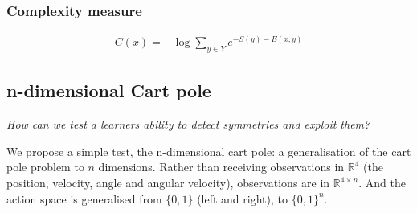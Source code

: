 \subsubsection{Complexity measure}

\begin{align*}
C(x) = -\log \sum_{y\in Y} e^{-S(y) - E(x, y)}
\end{align*}




%
%
%
%
%
%

\subsection{n-dimensional Cart pole}\label{action-space-experiments}

\begin{displayquote}
  \textit{How can we test a learners ability to detect symmetries and exploit them?}
\end{displayquote}

We propose a simple test, the n-dimensional cart pole: a generalisation of the
cart pole problem to $n$ dimensions. Rather than receiving observations in
$\mathbb{R}^4$ (the position, velocity, angle and angular velocity), observations are
in $\mathbb{R}^{4\times n}$. And the action space is generalised from $\{0,1\}$ (left and right),
to $\{0,1\}^{n}$.

\cite{Brockman2016,baselines}


